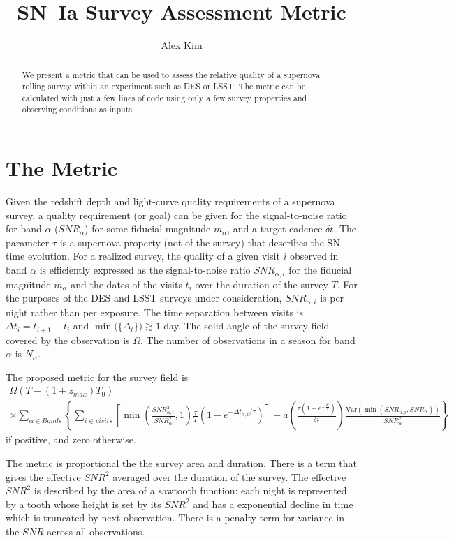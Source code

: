 \documentclass[preprint]{aastex}
\newcommand\SNR{\mathit{SNR}}
\newcommand{\Var}{\mathrm{Var}}
\begin{document}
\title{SN~Ia Survey Assessment Metric}
\author{Alex Kim}
\begin{abstract}
We present a metric that can be used to assess the relative quality of a supernova rolling survey within
an experiment such as DES or LSST.
The metric can be calculated with just a few lines of code using
only a few survey properties and observing conditions as inputs.
\end{abstract}

\section{The Metric}
Given the redshift depth and light-curve quality requirements of a supernova survey, a quality requirement (or goal) can be given
for the  signal-to-noise ratio for band $\alpha$ ($\SNR_\alpha$) for some fiducial magnitude $m_\alpha$, and a target cadence $\delta t$.
The parameter $\tau$ is a supernova property  (not of the survey) that describes the SN time evolution.
For a realized survey, the quality of a given visit $i$ observed in band $\alpha$ is efficiently expressed as the signal-to-noise ratio $\SNR_{\alpha, i}$
for the fiducial magnitude $m_\alpha$ and the dates of the visits $t_i$ over the duration of the survey $T$.  For the purposes
of the DES and LSST surveys under consideration, $\SNR_{\alpha, i}$ is per night rather than per exposure.
The time separation between visits is $\Delta t_i=t_{i+1}-t_i$ and $\min{(\{\Delta_t\}}) \gtrsim 1$ day.  The solid-angle of the survey field covered
by the observation is $\Omega$.  The number of observations in a season for band $\alpha$ is $N_\alpha$.


The proposed metric for the survey field is
\begin{multline}
	\Omega \left(T-(1+z_{max})T_0\right)   \\
	\times
	\sum_{\alpha \in Bands}	
		\left\{
			\sum_{i \in visits}		\left[ 		\min{\left(
				\frac{\SNR_{\alpha,i}^2}{\SNR_{\alpha}^{2} } ,1 \right)}
				\frac{\tau}{T}	\left(1-e^{-\Delta t_{\alpha,i}/\tau}\right)\right]
				-a\left(
		\frac{\tau(1-e^{-\frac{\delta t}{\tau}})}{\delta t}\right)		\frac{\Var\left(\min{\left(
				\SNR_{\alpha,i},{\SNR_{\alpha} }  \right)}
				\right)}{\SNR_\alpha^2}
				\right\}
\end{multline}
if positive, and zero otherwise.

The metric is proportional the the survey area and duration.  There is a term that gives the effective $\SNR^2$ averaged
over the duration of the survey.  The effective $\SNR^2$ is described by the area of a sawtooth function: each night is represented by a tooth
whose height is set by its $\SNR^2$ and has a exponential decline in time which is truncated by  next observation.  There is a penalty term
for variance in the $\SNR$ across all observations.
\end{document}
